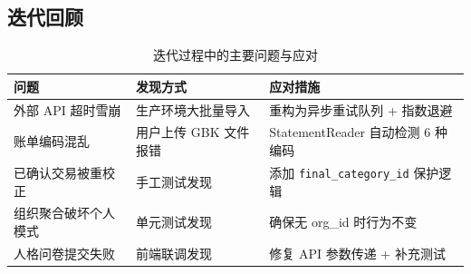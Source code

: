 \subsection{迭代回顾}

\begin{table}[H]
  \centering
  \small
  \caption{迭代过程中的主要问题与应对}
  \label{tab:iteration-issues}
  \begin{tabular}{@{}p{3.5cm} p{4.5cm} p{5cm}@{}}
    \toprule
    \textbf{问题} & \textbf{发现方式} & \textbf{应对措施} \\
    \midrule
    外部 API 超时雪崩 & 生产环境大批量导入 & 重构为异步重试队列 + 指数退避 \\
    \hline
    账单编码混乱 & 用户上传 GBK 文件报错 & StatementReader 自动检测 6 种编码 \\
    \hline
    已确认交易被重校正 & 手工测试发现 & 添加 \texttt{final\_category\_id} 保护逻辑 \\
    \hline
    组织聚合破坏个人模式 & 单元测试发现 & 确保无 org\_id 时行为不变 \\
    \hline
    人格问卷提交失败 & 前端联调发现 & 修复 API 参数传递 + 补充测试 \\
    \bottomrule
  \end{tabular}
\end{table}
